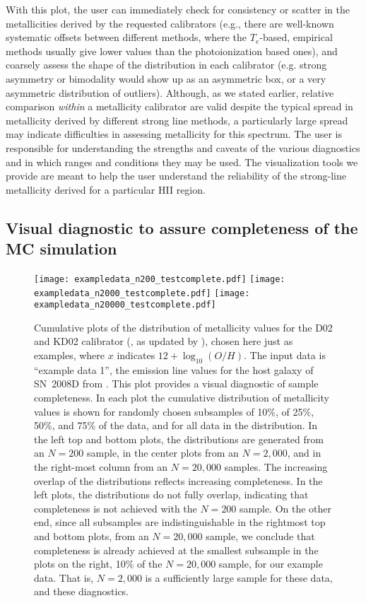 \documentclass{emulateapj}
\newcommand{\oxabinline}{\ensuremath{12 + \log_{10}(O/H)}}
\begin{document}
With this plot, the user can immediately check for consistency or
scatter in the metallicities derived by the requested calibrators
(e.g., there are well-known systematic offsets between different
methods, where the $T_e$-based, empirical methods usually give lower
values than the photoionization based ones), and coarsely assess the
shape of the distribution in each calibrator (e.g. strong asymmetry or
bimodality would show up as an asymmetric box, or a very asymmetric
distribution of outliers). Although, as we stated earlier, relative
comparison \emph{within} a metallicity calibrator are valid despite
the typical spread in metallicity derived by different strong line
methods, a particularly large spread may indicate difficulties in
assessing metallicity for this spectrum. The user is responsible for
understanding the strengths and caveats of the various diagnostics and
in which ranges and conditions they may be used. The visualization
tools we provide are meant to help the user understand the reliability
of the strong-line metallicity derived for a particular HII region.


\subsection{Visual diagnostic to assure completeness of the MC simulation}\label{sec:completeness}

\begin{figure*}[!ht]
\centerline{
  \texttt{[image: exampledata\_n200\_testcomplete.pdf]}
  \texttt{[image: exampledata\_n2000\_testcomplete.pdf]}
  \texttt{[image: exampledata\_n20000\_testcomplete.pdf]}}
\caption{Cumulative plots of the distribution of metallicity values
  for the D02 \citep{denicolo02} and KD02 calibrator
  (\citealt{kewley02}, as updated by \citealt{kewley08}), chosen here
  just as examples, where $x$ indicates \oxabinline. The input data is
  ``example data 1'', the emission line values for the host galaxy of
  SN~2008D from \citet{modjaz11}. This plot provides a visual
  diagnostic of sample completeness. In each plot the cumulative
  distribution of metallicity values is shown for randomly chosen
  subsamples of 10\%, of 25\%, 50\%, and 75\% of the data, and for all
  data in the distribution. In the left top and bottom plots, the
  distributions are generated from an $N=200$ sample, in the center
  plots from an $N=2,000$, and in the right-most column from an
  $N=20,000$ samples. The increasing overlap of the distributions
  reflects increasing completeness. In the left plots, the
  distributions do not fully overlap, indicating that completeness is
  not achieved with the $N=200$ sample. On the other end, since all
  subsamples are indistinguishable in the rightmost top and bottom
  plots, from an $N=20,000$ sample, we conclude that completeness is
  already achieved at the smallest subsample in the plots on the right,
  10\% of the $N=20,000$ sample, for our example data. That is,
  $N=2,000$ is a sufficiently large sample for these data, and these
  diagnostics.}
 \label{fig:cd}
\end{figure*}
\end{document}

